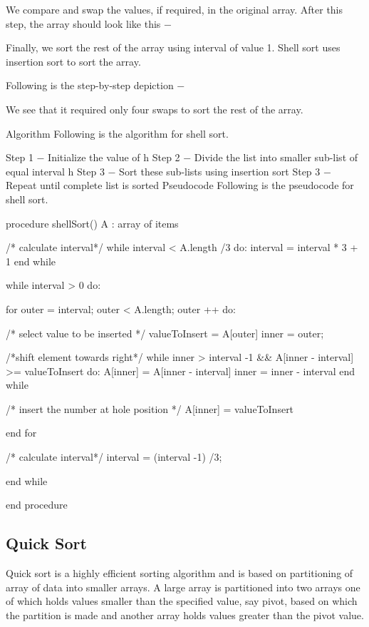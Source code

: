 We compare and swap the values, if required, in the original array. After this step, the array should look like this −



Finally, we sort the rest of the array using interval of value 1. Shell sort uses insertion sort to sort the array.

Following is the step-by-step depiction −



We see that it required only four swaps to sort the rest of the array.

Algorithm
Following is the algorithm for shell sort.

Step 1 − Initialize the value of h
Step 2 − Divide the list into smaller sub-list of equal interval h
Step 3 − Sort these sub-lists using insertion sort
Step 3 − Repeat until complete list is sorted
Pseudocode
Following is the pseudocode for shell sort.

procedure shellSort()
   A : array of items

   /* calculate interval*/
   while interval < A.length /3 do:
      interval = interval * 3 + 1
   end while

   while interval > 0 do:

      for outer = interval; outer < A.length; outer ++ do:

      /* select value to be inserted */
      valueToInsert = A[outer]
      inner = outer;

         /*shift element towards right*/
         while inner > interval -1 && A[inner - interval] >= valueToInsert do:
            A[inner] = A[inner - interval]
            inner = inner - interval
         end while

      /* insert the number at hole position */
      A[inner] = valueToInsert

      end for

   /* calculate interval*/
   interval = (interval -1) /3;

   end while

end procedure

\subsection{Quick Sort}

Quick sort is a highly efficient sorting algorithm and is based on partitioning of array of data into smaller arrays. A large array is partitioned into two arrays one of which holds values smaller than the specified value, say pivot, based on which the partition is made and another array holds values greater than the pivot value.

